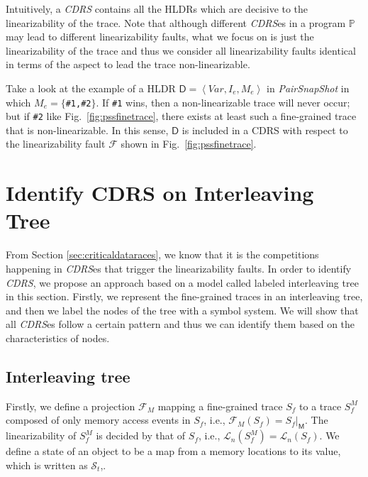 \documentclass[runningheads]{llncs}
\newcommand{\se}{\mathit{I_e}}
\newcommand{\ce}{\mathit{M_e}}
\begin{document}
Intuitively, a \textit{CDRS} contains all the HLDRs which are decisive to the linearizability of the trace. Note that although different \textit{CDRS}es in a program $\mathbb{P}$ may lead to different linearizability faults, what we focus on is just the linearizability of the trace and thus we consider all linearizability faults identical in terms of the aspect to lead the trace non-linearizable.

\begin{example} 

Take a look at the example of a HLDR $\mathsf{D}  = \left\langle \mathit{Var}, \se, \ce\right\rangle$  in \textit{PairSnapShot} in which $\ce = \{$\texttt{\#1,\#2}$\}$. If \texttt{\#1} wins, then a non-linearizable trace will never occur; but if \texttt{\#2} like Fig.~\ref{fig:pssfinetrace}, there exists at least such a fine-grained trace that is non-linearizable. In this sense,  $\mathsf{D}$ is included in a CDRS with respect to the linearizability fault $\mathcal{F}$ shown in Fig.~\ref{fig:pssfinetrace}.

\end{example}

\section{Identify CDRS on Interleaving Tree}\label{sec:intertree}
From Section \ref{sec:criticaldataraces}, we know that it is the competitions happening in \textit{CDRS}es that trigger the linearizability faults. In order to identify \textit{CDRS}, we propose an approach based on a model called labeled interleaving tree in this section. Firstly, we represent the fine-grained traces in an interleaving tree, and then we label the nodes of the tree with a symbol system. We will show that all \textit{CDRS}es follow a certain pattern and thus we can identify them based on the characteristics of nodes. 
\subsection{Interleaving tree}

Firstly, we define a projection $\mathcal{F}_M$ mapping a fine-grained trace $S_f$ to a trace $S^M_f$ composed of only memory access events in $S_f$, i.e., $\mathcal{F}_M(S_f) = S_f|_{\mathsf{M}}$. The linearizability of $S^M_f$ is decided by that of $S_f$, i.e., $\mathcal{L}_n(S^M_f)  = \mathcal{L}_n(S_f)$. We define a state of an object to be a map from a memory locations to its value, which is written as $\mathcal{S}_t$,.
\end{document}
